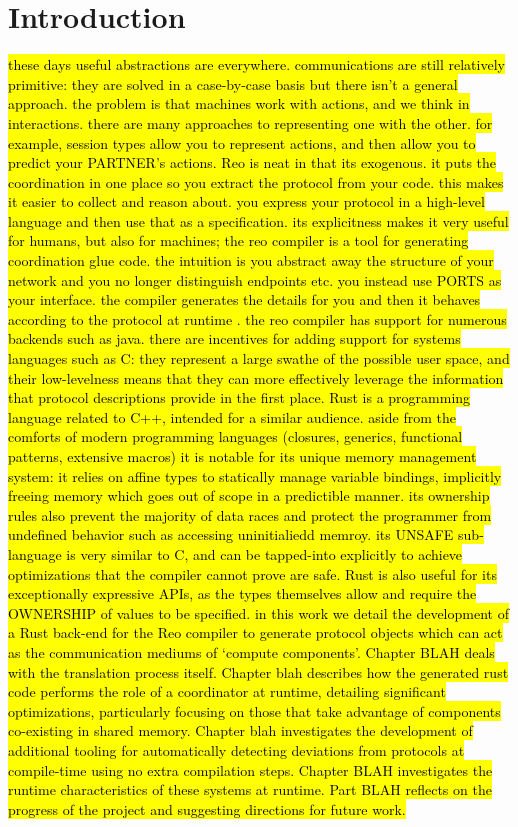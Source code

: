 \chapter{Introduction}
\hl{these days useful abstractions are everywhere. communications are still relatively primitive: they are solved in a case-by-case basis but there isn't a general approach. 
the problem is that machines work with actions, and we think in interactions. there are many approaches to representing one with the other. for example, session types allow you to represent actions, and then allow you to predict your PARTNER's actions.
Reo is neat in that its exogenous. it puts the coordination in one place so you extract the protocol from your code. this makes it easier to collect and reason about. you express your protocol in a high-level language and then use that as a specification.  its explicitness makes it very useful for humans, but also for machines; 
the reo compiler is a tool for generating coordination glue code. the intuition is you abstract away the structure of your network and you no longer distinguish endpoints etc. you instead use PORTS as your interface. the compiler generates the details for you and then it behaves according to the protocol at runtime . 
the reo compiler has support for numerous backends such as java. 
there are incentives for adding support for systems languages such as C: they represent a large swathe of the possible user space, and their low-levelness means that they can more effectively leverage the information that protocol descriptions provide in the first place.
Rust is a programming language related to C++, intended for a similar audience. aside from the comforts of modern programming languages (closures, generics, functional patterns, extensive macros) it is notable for its unique memory management system: it relies on affine types to statically manage variable bindings, implicitly freeing memory which goes out of scope in a predictible manner. its ownership rules also prevent the majority of data races and protect the programmer from undefined behavior such as accessing uninitialiedd memroy. its UNSAFE sub-language is very similar to C, and can be tapped-into explicitly to achieve optimizations that the compiler cannot prove are safe. Rust is also useful for its exceptionally expressive APIs, as the types themselves allow and require the OWNERSHIP of values to be specified. 
in this work we detail the development of a Rust back-end for the Reo compiler to generate protocol objects which can act as the communication mediums of `compute components'. Chapter BLAH deals with the translation process itself. Chapter blah describes how the generated rust code performs the role of a coordinator at runtime, detailing significant optimizations, particularly focusing on those that take advantage of components co-existing in shared memory. Chapter blah investigates the development of additional tooling for automatically detecting deviations from protocols at compile-time using no extra compilation steps. Chapter BLAH investigates the runtime characteristics of these systems at runtime. Part BLAH reflects on the progress of the project and suggesting directions for future work.
}

